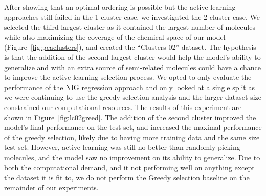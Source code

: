 \documentclass[journal=jmcmar,manuscript=article]{achemso}
\begin{document}
After showing that an optimal ordering is possible but the active learning approaches still failed in the 1 cluster case, we investigated the 2 cluster case. We selected the third largest cluster as it contained the largest number of molecules while also maximizing the coverage of the chemical space of our model (Figure~\ref{fig:pcaclusters}), and created the ``Clusters 02'' dataset. The hypothesis is that the addition of the second largest cluster would help the model's ability to generalize and with an extra source of semi-related molecules could have a chance to improve the active learning selection process. We opted to only evaluate the performance of the NIG regression approach and only looked at a single split as we were continuing to use the greedy selection analysis and the larger dataset size constrained our computational resources. The results of this experiment are shown in Figure~\ref{fig:lc02greed}. The addition of the second cluster improved the model's final performance on the test set, and increased the maximal performance of the greedy selection, likely due to having more training data and the same size test set. However, active learning was still no better than randomly picking molecules, and the model saw no improvement on its ability to generalize. Due to both the computational demand, and it not performing well on anything except the dataset it is fit to, we do not perform the Greedy selection baseline on the remainder of our experiments.
\end{document}
